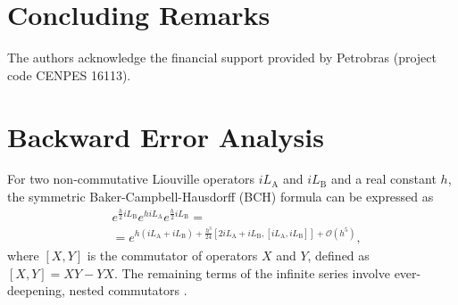\documentclass[
journal=jctcce,
layout=twocolumn
]{achemso}
\newcommand{\Liu}[1]{i\!L_\text{#1}}            %
\newcommand{\timestep}{h}
\begin{document}


\section{Concluding Remarks}
\label{sec:conclusion}

\begin{acknowledgement}
	The authors acknowledge the financial support provided by Petrobras (project code CENPES 16113).
\end{acknowledgement}

\appendix

\section{Backward Error Analysis}
\label{sec:rigid body shadow hamiltonian}

For two non-commutative Liouville operators $\Liu A$ and $\Liu B$ and a real constant $\timestep$, the symmetric Baker-Campbell-Hausdorff (BCH) formula can be expressed as \cite{Hairer_2006}
\begin{equation}
\label{eq:symmetric BCH}
\begin{split}
&e^{\frac{\timestep}{2} \Liu B} e^{\timestep \Liu A} e^{\frac{\timestep}{2} \Liu B} = \\
&= e^{\timestep (\Liu A + \Liu B) + \frac{\timestep^3}{24} \left[2 \Liu A + \Liu B,[\Liu A,\Liu B]\right] + \mathcal{O}(\timestep^5)},
\end{split}
\end{equation}
where $[X,Y]$ is the commutator of operators $X$ and $Y$, defined as $[X,Y] = XY - YX$.
The remaining terms of the infinite series involve ever-deepening, nested commutators \cite{Hairer_2006}.
\end{document}
